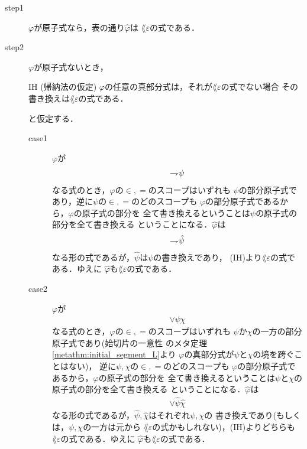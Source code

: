 	\begin{metaprf}\mbox{}
		\begin{description}
			\item[step1] $\varphi$が原子式なら，表の通り$\hat{\varphi}$は
				$\lang{\varepsilon}$の式である．
			
			\item[step2] $\varphi$が原子式ないとき，
				\begin{itembox}[l]{IH (帰納法の仮定)}
					$\varphi$の任意の真部分式は，それが$\lang{\varepsilon}$の式でない場合
					その書き換えは$\lang{\varepsilon}$の式である．
				\end{itembox}
				と仮定する．
				\begin{description}
					\item[case1] $\varphi$が
						\begin{align}
							\rightharpoondown\hspace{-0.25em} \psi
						\end{align}
						なる式のとき，$\varphi$の$\in,=$のスコープはいずれも
						$\psi$の部分原子式であり，逆に$\psi$の$\in,=$のどのスコープも
						$\varphi$の部分原子式であるから，$\varphi$の原子式の部分を
						全て書き換えるということは$\psi$の原子式の部分を全て書き換える
						ということになる．$\hat{\varphi}$は
						\begin{align}
							\rightharpoondown\hspace{-0.25em} \hat{\psi}
						\end{align}
						なる形の式であるが，$\hat{\psi}$は$\psi$の書き換えであり，
						(IH)より$\lang{\varepsilon}$の式である．ゆえに
						$\hat{\varphi}$も$\lang{\varepsilon}$の式である．
						
					\item[case2] $\varphi$が
						\begin{align}
							\vee \psi \chi
						\end{align}
						なる式のとき，$\varphi$の$\in,=$のスコープはいずれも
						$\psi$か$\chi$の一方の部分原子式であり(始切片の一意性
						のメタ定理\ref{metathm:initial_segment_L}より
						$\varphi$の真部分式が$\psi$と$\chi$の境を跨ぐことはない)，
						逆に$\psi,\chi$の$\in,=$のどのスコープも
						$\varphi$の部分原子式であるから，$\varphi$の原子式の部分を
						全て書き換えるということは$\psi$と$\chi$の原子式の部分を全て書き換える
						ということになる．$\hat{\varphi}$は
						\begin{align}
							\vee \hat{\psi} \hat{\chi}
						\end{align}
						なる形の式であるが，$\hat{\psi},\hat{\chi}$はそれぞれ$\psi,\chi$の
						書き換えであり(もしくは，$\psi,\chi$の一方は元から
						$\lang{\varepsilon}$の式かもしれない)，(IH)よりどちらも
						$\lang{\varepsilon}$の式である．ゆえに
						$\hat{\varphi}$も$\lang{\varepsilon}$の式である．
						

\end{description}
\end{description}
\end{metaprf}
